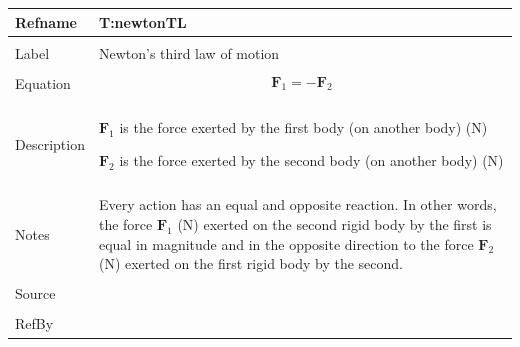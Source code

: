 \documentclass[12pt]{article}
\begin{document}
\noindent \begin{minipage}{\textwidth}
\begin{tabular}{p{} p{}}
\toprule \textbf{Refname} & \textbf{T:newtonTL}
\label{T:newtonTL}
\\ \midrule \\
Label & Newton's third law of motion
\\ \midrule \\
Equation & \begin{dmath}
           {\mathbf{F}_{1}}=-{\mathbf{F}_{2}}
           \end{dmath}
\\ \midrule \\
Description & \begin{symbDescription}
              \item{${\mathbf{F}_{1}}$ is the force exerted by the first body (on another body) (N)}
              \item{${\mathbf{F}_{2}}$ is the force exerted by the second body (on another body) (N)}
              \end{symbDescription}
\\ \midrule \\
Notes & Every action has an equal and opposite reaction. In other words, the force ${\mathbf{F}_{1}}$ (N) exerted on the second rigid body by the first is equal in magnitude and in the opposite direction to the force ${\mathbf{F}_{2}}$ (N) exerted on the first rigid body by the second.
\\ \midrule \\
Source & 
\\ \midrule \\
RefBy & 
\\ \bottomrule \end{tabular}
\end{minipage}\\
~\newline
\end{document}
